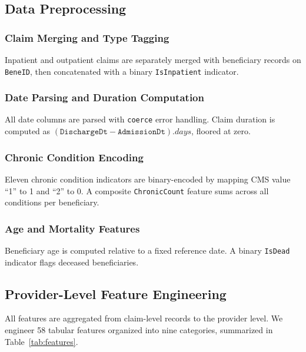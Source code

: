 \documentclass[conference]{IEEEtran}
\begin{document}
\subsection{Data Preprocessing}

\subsubsection{Claim Merging and Type Tagging}
Inpatient and outpatient claims are separately merged with beneficiary records on \texttt{BeneID}, then concatenated with a binary \texttt{IsInpatient} indicator.

\subsubsection{Date Parsing and Duration Computation}
All date columns are parsed with \texttt{coerce} error handling. Claim duration is computed as $(\texttt{DischargeDt} - \texttt{AdmissionDt}).days$, floored at zero.

\subsubsection{Chronic Condition Encoding}
Eleven chronic condition indicators are binary-encoded by mapping CMS value ``1'' to 1 and ``2'' to 0. A composite \texttt{ChronicCount} feature sums across all conditions per beneficiary.

\subsubsection{Age and Mortality Features}
Beneficiary age is computed relative to a fixed reference date. A binary \texttt{IsDead} indicator flags deceased beneficiaries.

\subsection{Provider-Level Feature Engineering}

All features are aggregated from claim-level records to the provider level. We engineer 58 tabular features organized into nine categories, summarized in Table~\ref{tab:features}.
\end{document}
